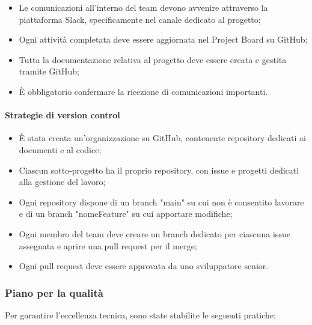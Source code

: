 \begin{itemize}
    \item Le comunicazioni all'interno del team devono avvenire attraverso la piattaforma Slack, specificamente nel canale dedicato al progetto;
    \item Ogni attività completata deve essere aggiornata nel Project Board su GitHub;
    \item Tutta la documentazione relativa al progetto deve essere creata e gestita tramite GitHub;
    \item È obbligatorio confermare la ricezione di comunicazioni importanti.
\end{itemize}

\paragraph{Strategie di version control}

\begin{itemize}
    \item È stata creata un'organizzazione su GitHub, contenente repository dedicati ai documenti e al codice;
    \item Ciascun sotto-progetto ha il proprio repository, con issue e progetti dedicati alla gestione del lavoro;
    \item Ogni repository dispone di un branch "main" su cui non è consentito lavorare e di un branch "nomeFeature" su cui apportare modifiche;
    \item Ogni membro del team deve creare un branch dedicato per ciascuna issue assegnata e aprire una pull request per il merge;
    \item Ogni pull request deve essere approvata da uno sviluppatore senior.
\end{itemize}

\subsubsection{Piano per la qualità}

Per garantire l'eccellenza tecnica, sono state stabilite le seguenti pratiche:

